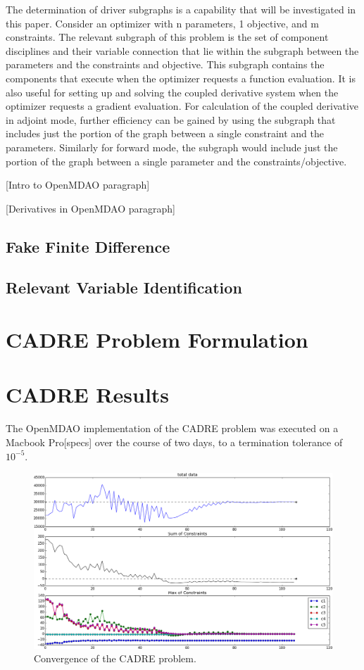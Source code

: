 \documentclass[]{aiaa-tc} %
\begin{document}
    The determination of driver subgraphs is a capability that will be investigated in this paper.
    Consider an optimizer with n parameters, 1 objective, and m constraints. The relevant
    subgraph of this problem is the set of component disciplines and their variable connection that
    lie within the subgraph between the parameters and the constraints and objective. This subgraph
    contains the components that execute when the optimizer requests a function evaluation. It is
    also useful for setting up and solving the coupled derivative system when the optimizer requests
    a gradient evaluation. For calculation of the coupled derivative in adjoint mode, further
    efficiency can be gained by using the subgraph that includes just the portion of the graph
    between a single constraint and the parameters. Similarly for forward mode, the subgraph would
    include just the portion of the graph between a single parameter and the constraints/objective.

    [Intro to OpenMDAO paragraph]

    [Derivatives in OpenMDAO paragraph]


    \subsection{Fake Finite Difference}
    \subsection{Relevant Variable Identification}

  \section{CADRE Problem Formulation}

  \section{CADRE Results}

The OpenMDAO implementation of the CADRE problem was executed on a Macbook Pro[specs]
over the course of two days, to a termination tolerance of $10^{-5}$.

\begin{figure}
\centering
\includegraphics[scale=0.23]{images/opt.png}
\caption[width=0.22\textwidth]{Convergence of the CADRE problem.}
\label{convergence}
\end{figure}
\end{document}
